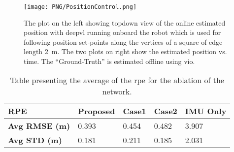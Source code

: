 \begin{figure}
    \centering
    \texttt{[image: PNG/PositionControl.png]}
    \caption{The plot on the left showing topdown view of the online estimated position with \ac{deepvl} running onboard the robot which is used for following position set-points along the vertices of a square of edge length \SI{2}{\meter}. The two plots on right show the estimated position vs. time. The ``Ground-Truth'' is estimated offline using \ac{vio}.}
    \label{fig:position_control}
\end{figure}

\begin{table}[]
\caption{Table presenting the average of the \ac{rpe} for the ablation of the network.}
\begin{tabular}{|l|l|l|l|l|}
\hline
\textbf{RPE}    & Proposed & Case1  & Case2 & IMU Only \\ \hline
\textbf{Avg RMSE (m)} & 0.393        & 0.454       & 0.482      & 3.907    \\ \hline
\textbf{Avg STD (m)}  & 0.181        & 0.211       & 0.185      & 2.031    \\ \hline
\end{tabular}%
\label{table:ablation}
\end{table}
